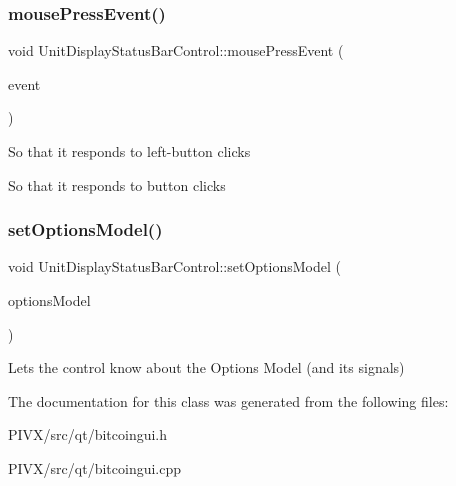 \subsubsection{\texorpdfstring{mouse\+Press\+Event()}{mousePressEvent()}}
{\footnotesize\ttfamily void Unit\+Display\+Status\+Bar\+Control\+::mouse\+Press\+Event (\begin{DoxyParamCaption}\item[{Q\+Mouse\+Event $\ast$}]{event }\end{DoxyParamCaption})\hspace{0.3cm}{\ttfamily [protected]}}

So that it responds to left-\/button clicks

So that it responds to button clicks \mbox{\label{class_unit_display_status_bar_control_ac8d2a43f66f3f71c7d6926dbd5927066}} 
\subsubsection{\texorpdfstring{set\+Options\+Model()}{setOptionsModel()}}
{\footnotesize\ttfamily void Unit\+Display\+Status\+Bar\+Control\+::set\+Options\+Model (\begin{DoxyParamCaption}\item[{\mbox{\hyperlink{class_options_model}{Options\+Model}} $\ast$}]{options\+Model }\end{DoxyParamCaption})}

Lets the control know about the Options Model (and its signals) 

The documentation for this class was generated from the following files\+:\begin{DoxyCompactItemize}
\item 
P\+I\+V\+X/src/qt/bitcoingui.\+h\item 
P\+I\+V\+X/src/qt/bitcoingui.\+cpp\end{DoxyCompactItemize}
